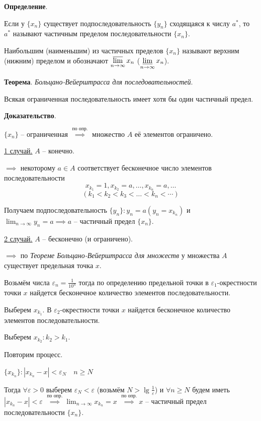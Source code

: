 \documentclass[a4paper,oneside]{article}
\newcommand{\bydef}{\stackrel{\text{по опр.}}{\implies}} %
\newcommand{\parspace}{\vspace{10pt}}
\newcommand{\dslim}{\displaystyle\lim}
\newcommand{\dslimn}{\dslim_{n \to \infty}}
\begin{document}
\parspace

\textbf{Определение}.

Если у $\{x_n\}$ существует подпоследовательность $\{y_n\}$ сходящаяся к числу $a^*$,
то $a^*$ называют частичным пределом последовательности $\{x_n\}$.

Наибольшим (наименьшим) из частичных пределов $\{x_n\}$ называют верхним (нижним) пределом
и обозначают $\displaystyle\varlimsup_{n \to \infty} x_n$
($\displaystyle\varliminf_{n \to \infty} x_n$).

\parspace

\textbf{Теорема}. \textit{Больцано-Вейерштрасса для последовательностей}.

Всякая ограниченная последовательность имеет хотя бы один частичный предел.

\textbf{Доказательство}.

$\{x_n\}$ -- ограниченная $\bydef$ множество $A$ её
элементов ограничено.

\underline{1 случай.} $A$ -- конечно.

$\implies$ некоторому $a \in A$ соответствует бесконечное число элементов последовательности 
\[x_{k_1} = 1, x_{k_2} = a, \dots, x_{k_n} = a, \dots\]
\[(k_1 < k_2 < k_3 < \dots < k_n < \cdots)\]

Получаем подпоследовательность $\{y_n\}: y_n = a (y_n = x_{k_n})$ и
$\dslimn y_n = a \implies a$ -- частичный предел $\{x_n\}$.

\underline{2 случай.} $A$ -- бесконечно (и ограничено).

$\implies$ по \textit{Теореме Больцано-Вейерштрасса для множеств} у множества $A$
существует предельная точка $x$.

Возьмём числа $\varepsilon_n = \frac{1}{10^n}$ тогда по определению предельной точки
в $\varepsilon_1$-окрестности точки $x$ найдется бесконечное количество элементов последовательности.

Выберем $x_{k_1}$. В $\varepsilon_2$-окрестности точки $x$ найдется бесконечное
количество элементов последовательности.

Выберем $x_{k_2}: k_2 > k_1$.

Повторим процесс.

$\{x_{k_n}\}: \left| x_{k_n} - x \right| < \varepsilon_N \quad n \ge N$

Тогда $\forall \varepsilon > 0$ выберем $\varepsilon_N < \varepsilon$
(возьмём $N > \lg \frac{1}{\varepsilon}$) и $\forall n \ge N$ будем иметь 
$\left| x_{k_n} - x \right| < \varepsilon$ 
$\bydef \dslimn x_{k_n} = x$
$\bydef x$ -- частичный предел последовательности $\{x_n\}$.
\end{document}
